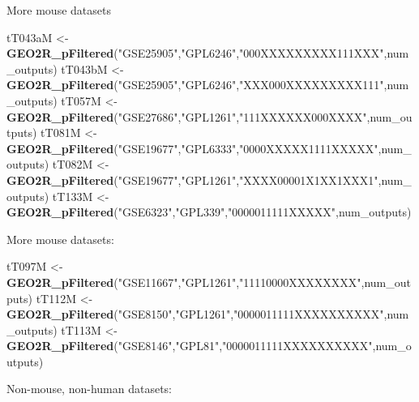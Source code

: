 \documentclass[
]{article}
\newenvironment{Shaded}{\begin{snugshade}}{\end{snugshade}}
\newcommand{\KeywordTok}[1]{\textcolor[rgb]{0.13,0.29,0.53}{\textbf{#1}}}
\newcommand{\NormalTok}[1]{#1}
\newcommand{\StringTok}[1]{\textcolor[rgb]{0.31,0.60,0.02}{#1}}
\begin{document}
More mouse datasets

\begin{Shaded}
\begin{Highlighting}[]
\NormalTok{tT043aM <-}\StringTok{ }\KeywordTok{GEO2R_pFiltered}\NormalTok{(}\StringTok{"GSE25905"}\NormalTok{,}\StringTok{"GPL6246"}\NormalTok{,}\StringTok{"000XXXXXXXXX111XXX"}\NormalTok{,num_outputs)}
\NormalTok{tT043bM <-}\StringTok{ }\KeywordTok{GEO2R_pFiltered}\NormalTok{(}\StringTok{"GSE25905"}\NormalTok{,}\StringTok{"GPL6246"}\NormalTok{,}\StringTok{"XXX000XXXXXXXXX111"}\NormalTok{,num_outputs)}
\NormalTok{tT057M <-}\StringTok{ }\KeywordTok{GEO2R_pFiltered}\NormalTok{(}\StringTok{"GSE27686"}\NormalTok{,}\StringTok{"GPL1261"}\NormalTok{,}\StringTok{"111XXXXXX000XXXX"}\NormalTok{,num_outputs)}
\NormalTok{tT081M <-}\StringTok{ }\KeywordTok{GEO2R_pFiltered}\NormalTok{(}\StringTok{"GSE19677"}\NormalTok{,}\StringTok{"GPL6333"}\NormalTok{,}\StringTok{"0000XXXXX1111XXXXX"}\NormalTok{,num_outputs)}
\NormalTok{tT082M <-}\StringTok{ }\KeywordTok{GEO2R_pFiltered}\NormalTok{(}\StringTok{"GSE19677"}\NormalTok{,}\StringTok{"GPL1261"}\NormalTok{,}\StringTok{"XXXX00001X1XX1XXX1"}\NormalTok{,num_outputs)}
\NormalTok{tT133M <-}\StringTok{ }\KeywordTok{GEO2R_pFiltered}\NormalTok{(}\StringTok{"GSE6323"}\NormalTok{,}\StringTok{"GPL339"}\NormalTok{,}\StringTok{"0000011111XXXXX"}\NormalTok{,num_outputs)}
\end{Highlighting}
\end{Shaded}

More mouse datasets:

\begin{Shaded}
\begin{Highlighting}[]
\NormalTok{tT097M <-}\StringTok{ }\KeywordTok{GEO2R_pFiltered}\NormalTok{(}\StringTok{"GSE11667"}\NormalTok{,}\StringTok{"GPL1261"}\NormalTok{,}\StringTok{"11110000XXXXXXXX"}\NormalTok{,num_outputs)}
\NormalTok{tT112M <-}\StringTok{ }\KeywordTok{GEO2R_pFiltered}\NormalTok{(}\StringTok{"GSE8150"}\NormalTok{,}\StringTok{"GPL1261"}\NormalTok{,}\StringTok{"0000011111XXXXXXXXXX"}\NormalTok{,num_outputs)}
\NormalTok{tT113M <-}\StringTok{ }\KeywordTok{GEO2R_pFiltered}\NormalTok{(}\StringTok{"GSE8146"}\NormalTok{,}\StringTok{"GPL81"}\NormalTok{,}\StringTok{"0000011111XXXXXXXXXX"}\NormalTok{,num_outputs)}
\end{Highlighting}
\end{Shaded}

Non-mouse, non-human datasets:
\end{document}
